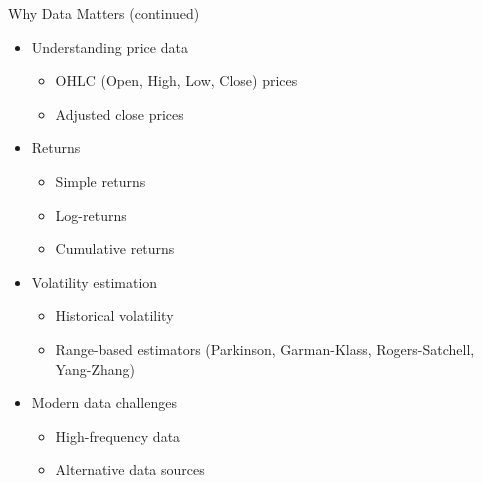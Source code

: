 \documentclass[9pt, aspectratio=169, t]{beamer}
\theoremstyle{definition}
\begin{document}
\begin{frame}{Why Data Matters (continued)}

\begin{itemize}
    \item Understanding price data
    \begin{itemize}
        \item OHLC (Open, High, Low, Close) prices
        \item Adjusted close prices
    \end{itemize}
    \item Returns
    \begin{itemize}
        \item Simple returns
        \item Log-returns
        \item Cumulative returns
    \end{itemize}
    \item Volatility estimation
    \begin{itemize}
        \item Historical volatility
        \item Range-based estimators (Parkinson, Garman-Klass, Rogers-Satchell, Yang-Zhang)
    \end{itemize}
    \item Modern data challenges
    \begin{itemize}
        \item High-frequency data
        \item Alternative data sources
    \end{itemize}
\end{itemize}

\end{frame}
\end{document}
